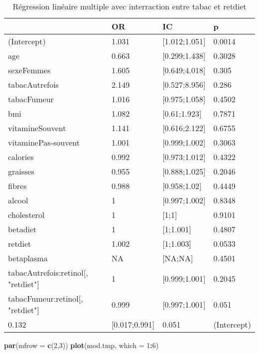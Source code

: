 \documentclass[]{article}
\newenvironment{Shaded}{\begin{snugshade}}{\end{snugshade}}
\newcommand{\KeywordTok}[1]{\textcolor[rgb]{0.13,0.29,0.53}{\textbf{#1}}}
\newcommand{\DataTypeTok}[1]{\textcolor[rgb]{0.13,0.29,0.53}{#1}}
\newcommand{\DecValTok}[1]{\textcolor[rgb]{0.00,0.00,0.81}{#1}}
\newcommand{\OperatorTok}[1]{\textcolor[rgb]{0.81,0.36,0.00}{\textbf{#1}}}
\newcommand{\NormalTok}[1]{#1}
\begin{document}
\begin{table}

\caption{\label{tab:unnamed-chunk-85}Régression linéaire multiple avec interraction entre tabac et retdiet}
\centering
\begin{tabular}[t]{l|l|l|l}
\hline
  & OR & IC & p\\
\hline
\rowcolor[HTML]{BBD2E1}  (Intercept) & 1.031 & [1.012;1.051] & 0.0014\\
\hline
age & 0.663 & [0.299;1.438] & 0.3028\\
\hline
\rowcolor[HTML]{BBD2E1}  sexeFemmes & 1.605 & [0.649;4.018] & 0.305\\
\hline
tabacAutrefois & 2.149 & [0.527;8.956] & 0.286\\
\hline
\rowcolor[HTML]{BBD2E1}  tabacFumeur & 1.016 & [0.975;1.058] & 0.4502\\
\hline
bmi & 1.082 & [0.61;1.923] & 0.7871\\
\hline
\rowcolor[HTML]{BBD2E1}  vitamineSouvent & 1.141 & [0.616;2.122] & 0.6755\\
\hline
vitaminePas-souvent & 1.001 & [0.999;1.002] & 0.3063\\
\hline
\rowcolor[HTML]{BBD2E1}  calories & 0.992 & [0.973;1.012] & 0.4322\\
\hline
graisses & 0.955 & [0.888;1.025] & 0.2046\\
\hline
\rowcolor[HTML]{BBD2E1}  fibres & 0.988 & [0.958;1.02] & 0.4449\\
\hline
alcool & 1 & [0.997;1.002] & 0.8348\\
\hline
\rowcolor[HTML]{BBD2E1}  cholesterol & 1 & [1;1] & 0.9101\\
\hline
betadiet & 1 & [1;1.001] & 0.4807\\
\hline
\rowcolor[HTML]{BBD2E1}  retdiet & 1.002 & [1;1.003] & 0.0533\\
\hline
betaplasma & NA & [NA;NA] & 0.4501\\
\hline
\rowcolor[HTML]{BBD2E1}  tabacAutrefois:retinol[, "retdiet"] & 1 & [0.999;1.001] & 0.2045\\
\hline
tabacFumeur:retinol[, "retdiet"] & 0.999 & [0.997;1.001] & 0.051\\
\hline
\rowcolor[HTML]{BBD2E1}  0.132 & [0.017;0.991] & 0.051 & (Intercept)\\
\hline
\end{tabular}
\end{table}

\begin{Shaded}
\begin{Highlighting}[]
\KeywordTok{par}\NormalTok{(}\DataTypeTok{mfrow =} \KeywordTok{c}\NormalTok{(}\DecValTok{2}\NormalTok{,}\DecValTok{3}\NormalTok{))}
\KeywordTok{plot}\NormalTok{(mod.tmp, }\DataTypeTok{which =} \DecValTok{1}\OperatorTok{:}\DecValTok{6}\NormalTok{)}
\end{Highlighting}
\end{Shaded}
\end{document}
